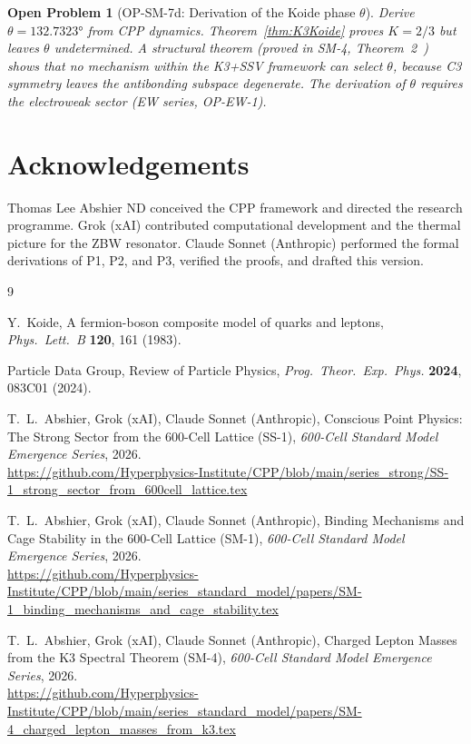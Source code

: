 \documentclass[11pt]{article}
\newtheorem{openproblem}{Open Problem}
\begin{document}
\begin{openproblem}[OP-SM-7d: Derivation of the Koide phase $\theta$]
\label{op:theta}
Derive $\theta = 132.7323°$ from CPP dynamics.
Theorem~\ref{thm:K3Koide} proves $K = 2/3$ but leaves $\theta$
undetermined.  A structural theorem (proved in SM-4,
Theorem~2~\cite{abshier_sm4}) shows that no mechanism within the
K3+SSV framework can select $\theta$, because C3 symmetry leaves
the antibonding subspace degenerate.  The derivation of $\theta$
requires the electroweak sector (EW series, OP-EW-1).
\end{openproblem}

\section*{Acknowledgements}

Thomas Lee Abshier ND conceived the CPP framework and directed the
research programme.  Grok (xAI) contributed computational development
and the thermal picture for the ZBW resonator.  Claude Sonnet (Anthropic)
performed the formal derivations of P1, P2, and P3, verified the
proofs, and drafted this version.

\begin{thebibliography}{9}

Y.~Koide,
A fermion-boson composite model of quarks and leptons,
\textit{Phys.\ Lett.\ B} \textbf{120}, 161 (1983).

Particle Data Group,
Review of Particle Physics,
\textit{Prog.\ Theor.\ Exp.\ Phys.} \textbf{2024}, 083C01 (2024).

T.~L.~Abshier, Grok (xAI), Claude Sonnet (Anthropic),
Conscious Point Physics: The Strong Sector from the 600-Cell Lattice (SS-1),
\textit{600-Cell Standard Model Emergence Series}, 2026.\\
\url{https://github.com/Hyperphysics-Institute/CPP/blob/main/series_strong/SS-1_strong_sector_from_600cell_lattice.tex}

T.~L.~Abshier, Grok (xAI), Claude Sonnet (Anthropic),
Binding Mechanisms and Cage Stability in the 600-Cell Lattice (SM-1),
\textit{600-Cell Standard Model Emergence Series}, 2026.\\
\url{https://github.com/Hyperphysics-Institute/CPP/blob/main/series_standard_model/papers/SM-1_binding_mechanisms_and_cage_stability.tex}

T.~L.~Abshier, Grok (xAI), Claude Sonnet (Anthropic),
Charged Lepton Masses from the K3 Spectral Theorem (SM-4),
\textit{600-Cell Standard Model Emergence Series}, 2026.\\
\url{https://github.com/Hyperphysics-Institute/CPP/blob/main/series_standard_model/papers/SM-4_charged_lepton_masses_from_k3.tex}

\end{thebibliography}
\end{document}
